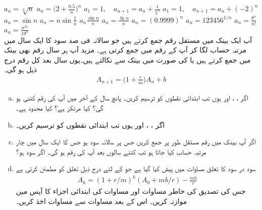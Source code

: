 $a_n=\sqrt[n]{n}$
$a_n=\big(2+\frac{0.5}{n}\big)^n$
$a_1=1,\quad a_{n+1}=a_n+\frac{1}{5^n}$
$a_1=1,\quad a_{n+1}=a_n+(-2)^n$
$a_n=\sin n$
$a_n=n\sin\frac{1}{n}$
$a_n\frac{\sin n}{n}$
$a_n=\frac{\ln n}{n}$
$a_n=(0.9999)^n$
$a_n=123456^{1/n}$
$a_n=\frac{8^n}{n!}$
$a_n=\frac{n^{41}}{19^n}$
\\
آپ ایک بینک میں مستقل رقم  جمع کرتے ہیں جو سالانہ  فی صد سود کا ایک سال میں  مرتبہ حساب لگا کر  آپ کے رقم میں جمع کرتی ہے۔ مزید آپ ہر سال  رقم بھی بینک میں جمع کرتے ہیں یا  کی صورت میں بینک سے نکالتے ہیں۔یوں  سال بعد کل رقم درج ذیل ہو گی۔
\begin{align}\label{مساوات_تسلسل_سود_در_سود_الف}
A_{n+1}=\big(1+\frac{r}{m}\big)A_n+b
\end{align}
\begin{enumerate}[a.]
\item
اگر ، ،  اور  ہوں تب ابتدائی  نقطوں  کو ترسیم کریں۔ پانچ سال کے آخر میں آپ کی رقم کتنی ہو گی؟ کیا  مرتکز ہے؟ کیا  محدود ہے۔
\item
اگر ، ،  اور  ہوں تب ابتدائی  نقطوں  کو ترسیم کریں۔
\item
اگر آپ بینک میں  رقم مستقل طور پر جمع کریں جس  پر سالانہ  سود ہو جس کا ایک سال میں چار مرتبہ  حساب کیا جاتا ہو تب کتنے سالوں بعد آپ کی رقم  ہو گی۔ اگر سود  ہو؟
\item
سود در سود کا تعلق مساوات  میں پیش کیا گیا ہے جو  کے لئے درج ذیل تعلق کو مطمئن کرتی  ہے
\begin{align}\label{مساوات_تسلسل_سود_در_سود_ب}
A_k=(1+r/m)^k(A_0+mb/r)-\frac{mb}{r}
\end{align}
جس کی تصدیق کی خاطر مساوات  اور مساوات  کی ابتدائی  اجزاء کا آپس میں موازنہ کریں۔ اس کے بعد مساوات  سے مساوات  اخذ کریں۔
\end{enumerate}
